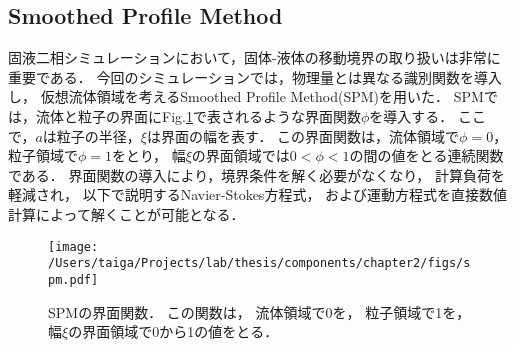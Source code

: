 \subsection{Smoothed Profile Method}
固液二相シミュレーションにおいて，固体-液体の移動境界の取り扱いは非常に重要である．
今回のシミュレーションでは，物理量とは異なる識別関数を導入し，
仮想流体領域を考えるSmoothed Profile Method(SPM)\cite{spm}を用いた．
SPMでは，流体と粒子の界面にFig.\ref{fig:spm}で表されるような界面関数$\phi$を導入する．
ここで，$a$は粒子の半径，$\xi$は界面の幅を表す．
この界面関数は，流体領域で$\phi=0$，粒子領域で$\phi=1$をとり，
幅$\xi$の界面領域では$0< \phi <1$の間の値をとる連続関数である．
界面関数の導入により，境界条件を解く必要がなくなり，
計算負荷を軽減され，
以下で説明するNavier-Stokes方程式，
および運動方程式を直接数値計算によって解くことが可能となる．

    \begin{figure}[H]
        \centering
        \texttt{[image: /Users/taiga/Projects/lab/thesis/components/chapter2/figs/spm.pdf]}
        \caption{SPMの界面関数．
        この関数は，
        流体領域で0を，
        粒子領域で1を，
        幅$\xi$の界面領域で0から1の値をとる．}
        \label{fig:spm}
    \end{figure}

